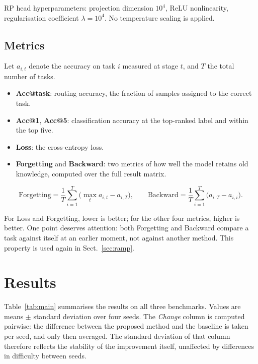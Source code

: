 \documentclass[11pt,a4paper]{article}
\begin{document}
RP head hyperparameters: projection dimension $10^4$, ReLU nonlinearity,
regularisation coefficient $\lambda = 10^4$. No temperature scaling is applied.

\subsection{Metrics}

Let $a_{i,t}$ denote the accuracy on task $i$ measured at stage $t$, and $T$ the
total number of tasks.

\begin{itemize}[leftmargin=*, itemsep=2pt]
\item \textbf{Acc@task}: routing accuracy, the fraction of samples assigned to
      the correct task.
\item \textbf{Acc@1}, \textbf{Acc@5}: classification accuracy at the top-ranked
      label and within the top five.
\item \textbf{Loss}: the cross-entropy loss.
\item \textbf{Forgetting} and \textbf{Backward}: two metrics of how well the
      model retains old knowledge, computed over the full result matrix.
\end{itemize}

\begin{equation}
\mathrm{Forgetting} = \frac{1}{T}\sum_{i=1}^{T}
\Big( \max_{t} a_{i,t} - a_{i,T} \Big),
\qquad
\mathrm{Backward} = \frac{1}{T}\sum_{i=1}^{T} \big( a_{i,T} - a_{i,i} \big).
\end{equation}

For Loss and Forgetting, lower is better; for the other four metrics, higher is
better. One point deserves attention: both Forgetting and Backward compare a
task against itself at an earlier moment, not against another method. This
property is used again in Sect.~\ref{sec:ramp}.

\section{Results}
\label{sec:results}

Table~\ref{tab:main} summarises the results on all three benchmarks. Values are
means $\pm$ standard deviation over four seeds. The \emph{Change} column is
computed pairwise: the difference between the proposed method and the baseline
is taken per seed, and only then averaged. The standard deviation of that column
therefore reflects the stability of the improvement itself, unaffected by
differences in difficulty between seeds.
\end{document}

